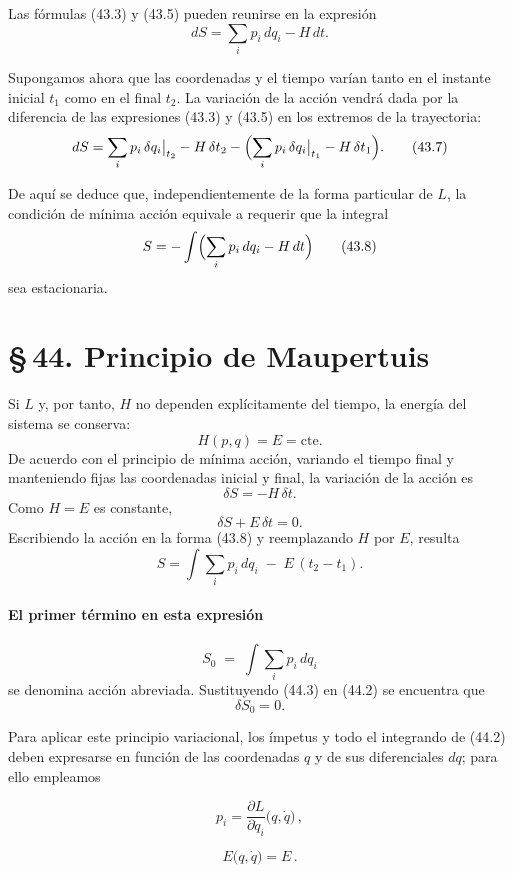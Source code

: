 \documentclass[12pt]{article}
\begin{document}
Las fórmulas (43.3) y (43.5) pueden reunirse en la expresión
\[
dS = \sum_i p_i\,dq_i - H\,dt.
\tag{43.6}
\]

Supongamos ahora que las coordenadas y el tiempo varían tanto en el instante inicial \(t_1\) como en el final \(t_2\). La variación de la acción vendrá dada por la diferencia de las expresiones (43.3) y (43.5) en los extremos de la trayectoria:
\[
dS
=\sum_i p_i\,\delta q_i\big\vert_{t_2}
 - H\,\delta t_2
-\Bigl(\sum_i p_i\,\delta q_i\big\vert_{t_1}
 - H\,\delta t_1\Bigr).
\tag{43.7}
\]

De aquí se deduce que, independientemente de la forma particular de \(L\), la condición de mínima acción equivale a requerir que la integral
\[
S=-\int\Bigl(\sum_i p_i\,dq_i - H\,dt\Bigr)
\tag{43.8}
\]
sea estacionaria.

\section*{\S\,44. Principio de Maupertuis}

Si \(L\) y, por tanto, \(H\) no dependen explícitamente del tiempo, la energía del sistema se conserva:
\[
H(p,q)=E=\mathrm{cte}.
\]
De acuerdo con el principio de mínima acción, variando el tiempo final y manteniendo fijas las coordenadas inicial y final, la variación de la acción es
\[
\delta S = -H\,\delta t.
\tag{44.1}
\]
Como \(H=E\) es constante,
\[
\delta S + E\,\delta t = 0.
\tag{44.2}
\]
Escribiendo la acción en la forma (43.8) y reemplazando \(H\) por \(E\), resulta
\[
S = \int \sum_i p_i\,dq_i \;-\; E\,(t_2 - t_1).
\tag{44.3}
\]

\paragraph*{El primer término en esta expresión}
\[
S_0 \;=\;\int \sum_i p_i\,dq_i
\tag{44.4}
\]
se denomina acción abreviada. Sustituyendo (44.3) en (44.2) se encuentra que
\[
\delta S_0 = 0.
\tag{44.5}
\]

Para aplicar este principio variacional, los ímpetus y todo el integrando de (44.2) deben expresarse en función de las coordenadas \(q\) y de sus diferenciales \(dq\); para ello empleamos

\begin{equation}
p_i = \frac{\partial L}{\partial \dot q_i}\bigl(q,\dot q\bigr)\,,
\tag{44.6}
\end{equation}

\begin{equation}
E\bigl(q,\dot q\bigr) = E\,.
\tag{44.7}
\end{equation}
\end{document}

